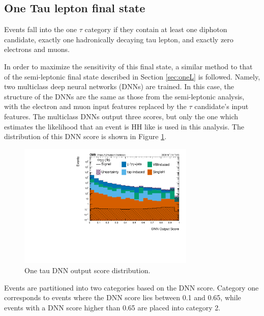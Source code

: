 \subsection{One Tau lepton final state}
\label{sec:oneT}

Events fall into the one $\tau$ category if they contain at least one diphoton candidate, 
exactly one hadronically decaying tau lepton, and exactly zero electrons and muons. 

In order to maximize the sensitivity of this final state, a similar method to that of the semi-leptonic final state described in Section \ref{sec:oneL} is followed. Namely, two multiclass deep neural networks (DNNs) are trained. In this case, the structure of the DNNs are the same as those from the semi-leptonic analysis, with the electron and muon input features replaced by the $\tau$ candidate's input features. The multiclass DNNs output three scores, but only the one which estimates the likelihood that an event is HH like is used in this analysis. The distribution of this DNN score is shown in Figure \ref{fig:tau_perf}.

\begin{figure}[!htb]
    \centering
    \includegraphics[width=0.75\textwidth]{Sections/Phase_II_HH/images/DNN/DNN_Score_tt_logy.pdf}
    \caption{One tau DNN output score distribution.}
    \label{fig:tau_perf}
\end{figure}

Events are partitioned into two categories based on the DNN score. Category one corresponds to events where the DNN score lies between 0.1 and 0.65, while events with a DNN score higher than 0.65 are placed into category 2. 


